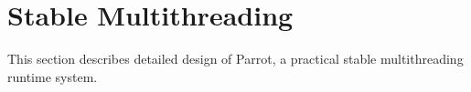 \section{Stable Multithreading} \label{sec:stablemt}

This section describes detailed design of Parrot, a practical stable 
multithreading runtime system.

